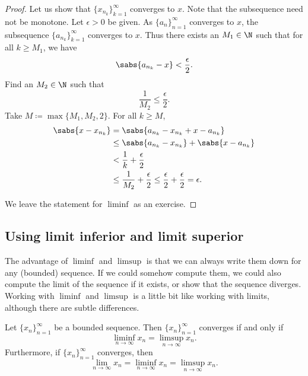 \begin{proof}
Let us show that $\{ x_{n_k} \}_{k=1}^\infty$ converges to $x$.
Note that the subsequence need not be monotone.  Let $\epsilon > 0$ be given.
As $\{ a_n \}_{n=1}^\infty$ converges to $x$, the subsequence
$\{ a_{n_k} \}_{k=1}^\infty$ converges to $x$.
Thus there exists an $M_1 \in \N$
such that for all $k \geq M_1$, we have
\begin{equation*}
\sabs{a_{n_k} - x} < \frac{\epsilon}{2} .
\end{equation*}
Find an $M_2 \in \N$ such that
\begin{equation*}
\frac{1}{M_2} \leq \frac{\epsilon}{2}.
\end{equation*}
Take $M \coloneqq \max \{M_1 , M_2 , 2 \}$.  For all $k \geq M$,
\begin{equation*}
\begin{split}
\sabs{x- x_{n_k}} & =
\sabs{a_{n_k} - x_{n_k} + x - a_{n_k}}
\\
& \leq \sabs{a_{n_k} - x_{n_k}} + \sabs{x - a_{n_k}}
\\
& < \frac{1}{k} + \frac{\epsilon}{2}
\\
& \leq \frac{1}{M_2} + \frac{\epsilon}{2} \leq \frac{\epsilon}{2} +
\frac{\epsilon}{2} = \epsilon .
\end{split}
\end{equation*}

We leave the statement for $\liminf$ as an exercise.
\end{proof}

\subsection{Using limit inferior and limit superior}

The advantage of $\liminf$ and $\limsup$ is that we can always write them
down for any (bounded) sequence.
If we could somehow compute them, we could also compute the limit of the
sequence if it exists, or show that the sequence diverges.
Working with $\liminf$ and $\limsup$ is a
little bit like working with limits, although there are subtle differences.

\begin{prop} \label{liminfsupconv:prop}
Let $\{ x_n \}_{n=1}^\infty$ be a bounded sequence.  Then
$\{ x_n \}_{n=1}^\infty$ converges
if and only if
\begin{equation*}
\liminf_{n\to \infty} x_n = 
\limsup_{n\to \infty} x_n.
\end{equation*}
Furthermore, if $\{ x_n \}_{n=1}^\infty$ converges, then
\begin{equation*}
\lim_{n\to \infty} x_n = 
\liminf_{n\to \infty} x_n = 
\limsup_{n\to \infty} x_n.
\end{equation*}
\end{prop}

